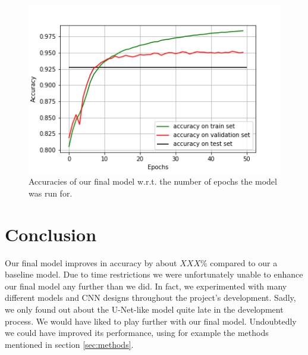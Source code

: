 \documentclass[10pt,conference,compsocconf]{IEEEtran}
\begin{document}
\begin{figure}[h]
	\centering
	\includegraphics[width=\columnwidth]{U_Net_patches_256.png}
	\captionsetup{justification=centering, margin=0.2cm}
	\caption{Accuracies of our final model w.r.t. the number of epochs the model was run for.}
	\vspace{-6mm}
	\label{fig:final}
\end{figure}

\bigskip
\bigskip

\section{Conclusion}
\label{sec:conclusion}

Our final model improves in accuracy by about $XXX\%$ compared to our a baseline model. Due to time restrictions we were unfortunately unable to enhance our final model any further than we did. In fact, we experimented with many different models and CNN designs throughout the project's development. Sadly, we only found out about the U-Net-like model quite late in the development process. We would have liked to play further with our final model. Undoubtedly we could have improved its performance, using for example the methods mentioned in section \ref{sec:methods}. 
\end{document}
